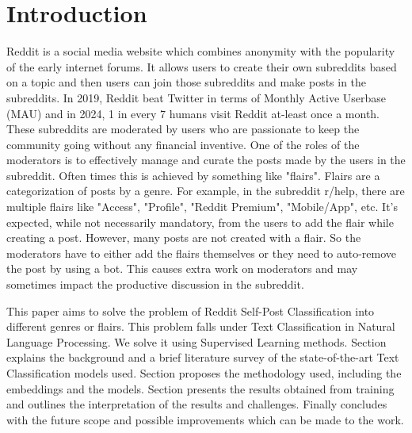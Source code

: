 \documentclass[conference]{IEEEtran}
\newcommand{\RNum}[1]{\uppercase\expandafter{\romannumeral #1\relax}}
\begin{document}
\section{Introduction}
Reddit is a social media website which combines anonymity with the popularity of the early internet forums. It allows users to create their own subreddits based on a topic and then users can join those subreddits and make posts in the subreddits. In 2019, Reddit beat Twitter in terms of Monthly Active Userbase (MAU) and in 2024, 1 in every 7 humans visit Reddit at-least once a month. These subreddits are moderated by users who are passionate to keep the community going without any financial inventive. One of the roles of the moderators is to effectively manage and curate the posts made by the users in the subreddit. Often times this is achieved by something like "flairs". Flairs are a categorization of posts by a genre. For example, in the subreddit r/help, there are multiple flairs like "Access", "Profile", "Reddit Premium", "Mobile/App", etc. It's expected, while not necessarily mandatory, from the users to add the flair while creating a post. However, many posts are not created with a flair. So the moderators have to either add the flairs themselves or they need to auto-remove the post by using a bot. This causes extra work on moderators and may sometimes impact the productive discussion in the subreddit. 

This paper aims to solve the problem of Reddit Self-Post Classification into different genres or flairs. This problem falls under Text Classification in Natural Language Processing. We solve it using Supervised Learning methods. Section \RNum{2} explains the background and a brief literature survey of the state-of-the-art Text Classification models used. Section \RNum{3} proposes the methodology used, including the embeddings and the models. Section \RNum{4} presents the results obtained from training and \RNum{5} outlines the interpretation of the results and challenges. Finally \RNum{6} concludes with the future scope and possible improvements which can be made to the work. 


 

\end{document}
